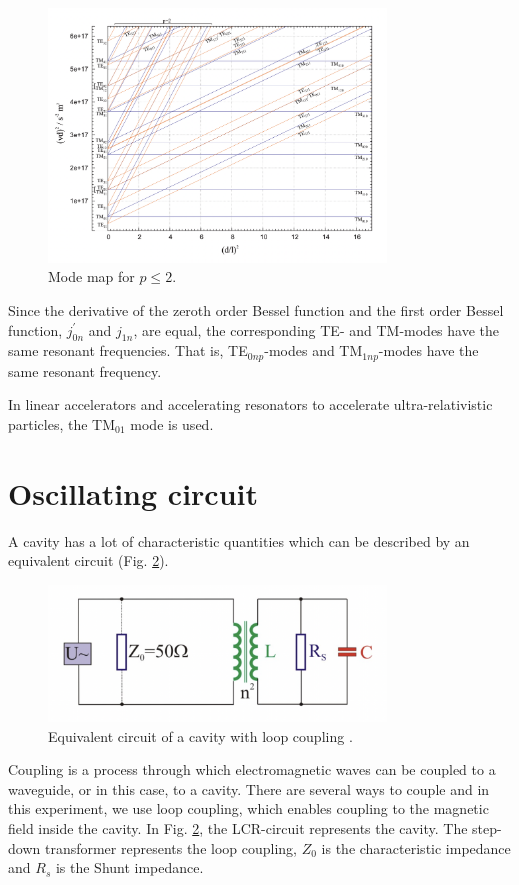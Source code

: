 \documentclass[a4paper]{report}
\numberwithin{equation}{section}
\begin{document}
\begin{figure}[hbt!]
    \centering
    \includegraphics[width=0.8\textwidth]{mode_map}
	\caption{Mode map for $p \leq 2$. \cite{Hillert}}
    \label{fig:mode}
\end{figure}

Since the derivative of the zeroth order Bessel function and the first order
Bessel function, $j^{'}_{0n}$ and $j_{1n}$, are equal, the corresponding TE- and
TM-modes have the same resonant frequencies. That is, TE$_{0np}$-modes and
TM$_{1np}$-modes have the same resonant frequency. 

In linear accelerators and accelerating resonators to accelerate ultra-relativistic particles, the TM$_{01}$ mode is used. 
\section{Oscillating circuit}
A cavity has a lot of characteristic quantities which can be described by an
equivalent circuit (Fig. \ref{fig:circuit}). 
\begin{figure}[hbt!]
    \centering
    \includegraphics[width=0.8\textwidth]{circuit}
	\caption{Equivalent circuit of a cavity with loop coupling \cite{Hillert}.}
    \label{fig:circuit}
\end{figure}	

Coupling is a process through which electromagnetic waves can be coupled to a
waveguide, or in this case, to a cavity. There are several ways to couple and in
this experiment, we use loop coupling, which enables coupling to the magnetic
field inside the cavity. In Fig. \ref{fig:circuit}, the LCR-circuit
represents the cavity. The step-down transformer represents the loop coupling,
$Z_{0}$ is the characteristic impedance and $R_{s}$ is the Shunt impedance. 
\end{document}
